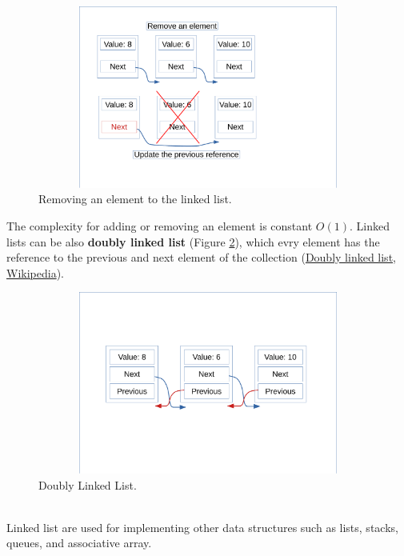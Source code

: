 \newpage
\begin{figure}[]
	\includegraphics[width=14cm,height=6cm]{chapters/datastructures/images/linked_list_3.pdf}
	\caption[]{Removing an element to the linked list.}
	\label{linked_list_3}
\end{figure}
The complexity for adding or removing an element is constant \(O(1)\).
Linked lists can be also \textbf{doubly linked list} (Figure \ref{linked_list_4}), which evry element has the reference to the previous and next element of the collection \cite{wikidoublylinkedlist} (\href{https://en.wikipedia.org/wiki/Doubly_linked_list}{Doubly linked list, Wikipedia}).
\begin{figure}[hb]
	\includegraphics[width=14cm,height=6cm]{chapters/datastructures/images/linked_list_4.pdf}
	\caption[]{Doubly Linked List.}
	\label{linked_list_4}
\end{figure} 
\\
Linked list are used for implementing other data structures such as lists, stacks, queues, and associative array.
\newpage
